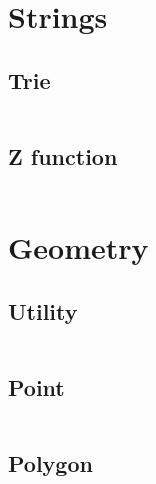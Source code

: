\section{Strings}
  \subsection{Trie}
    \inputminted{cpp}{library/strings/trie.hpp}
  \subsection{Z function}
    \inputminted{cpp}{library/strings/z_function.hpp}

\section{Geometry}
  \subsection{Utility}
    \inputminted{cpp}{library/geo/geoutil.hpp}
  \subsection{Point}
    \inputminted{cpp}{library/geo/point.hpp}
  \subsection{Polygon}
    \inputminted{cpp}{library/geo/polygon.hpp}